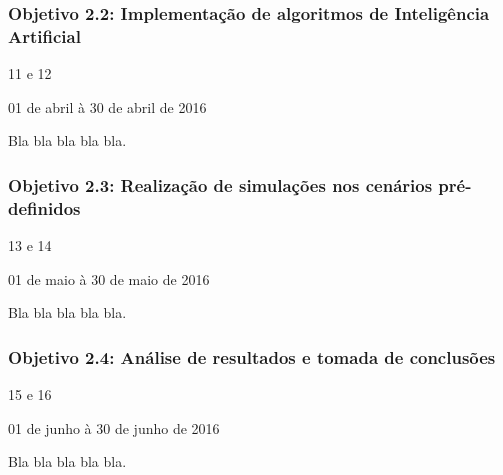 \subsubsection{\textbf{Objetivo 2.2}: Implementação de algoritmos de Inteligência Artificial}

\begin{description}[leftmargin=!,labelwidth=\widthof{\bfseries Descrição}]
  \item[Iterações] 11 e 12
  \item[Período]   01 de abril à 30 de abril de 2016
  \item[Descrição] Bla bla bla bla bla.
\end{description}

\subsubsection{\textbf{Objetivo 2.3}: Realização de simulações nos cenários pré-definidos}

\begin{description}[leftmargin=!,labelwidth=\widthof{\bfseries Descrição}]
  \item[Iterações] 13 e 14
  \item[Período]   01 de maio à 30 de maio de 2016
  \item[Descrição] Bla bla bla bla bla.
\end{description}

\subsubsection{\textbf{Objetivo 2.4}: Análise de resultados e tomada de conclusões}

\begin{description}[leftmargin=!,labelwidth=\widthof{\bfseries Descrição}]
  \item[Iterações] 15 e 16
  \item[Período]   01 de junho à 30 de junho de 2016
  \item[Descrição] Bla bla bla bla bla.
\end{description}